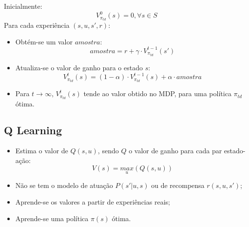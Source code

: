 \documentclass{beamer}
\begin{document}

\begin{frame}
Inicialmente:
$$V_{\pi_{td}}^0 \left( s \right) = 0 , \forall s \in S $$\pause
Para cada experiência $ \left( s, u, s', r \right) $:\pause
\begin{itemize}
	\item Obtém-se um valor $ amostra $:
		$$ amostra = r + \gamma \cdot V_{\pi_{td}}^{t-1} \left( s' \right) $$\pause
	\item Atualiza-se o valor de ganho para o estado $ s $:
		$$ V_{\pi_{td}}^t \left( s \right) = \left( 1 - \alpha \right) \cdot V_{\pi_{td}}^{t-1} \left( s \right) + \alpha \cdot amostra $$\pause
	\item Para $ t \rightarrow \infty $, $ V_{\pi_{td}}^t \left( s \right) $ tende ao valor obtido no MDP, para uma política $ \pi_{td} $ ótima.
\end{itemize}
\end{frame}


\subsection{Q Learning}

\begin{frame}
\begin{itemize}
	\item Estima o valor de $ Q \left( s, u \right) $, sendo $ Q $ o valor de ganho para cada par estado-ação:
		$$ V \left( s \right) = \underset{u}{max} \left( Q \left( s, u \right) \right) $$\pause
	\item Não se tem o modelo de atuação $ P \left(s' | u, s \right) $
	ou de recompensa $ r \left( s, u, s' \right) $;\pause
	\item Aprende-se os valores a partir de experiências reais;\pause
	\item Aprende-se uma política $ \pi \left( s \right) $ ótima.
\end{itemize}
\end{frame}

\end{document}
